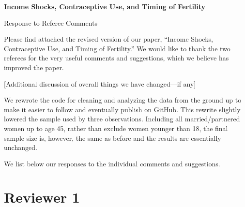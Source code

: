 \documentclass[letterpaper,12pt]{article}
\title{} \author{}
\begin{document}
\begin{center} \textbf{\large Income Shocks, Contraceptive Use, and
Timing of Fertility} \end{center}

\begin{center} Response to Referee Comments \end{center}

\noindent Please find attached the revised version of our paper,
``Income Shocks, Contraceptive Use, and Timing of Fertility.''
We would like to thank the two referees for the very useful comments and
suggestions,
which we believe has improved the paper.

[Additional discussion of overall things we have changed---if any]

We rewrote the code for cleaning and analyzing the data from the ground up 
to make it easier to follow and eventually publish on GitHub.
This rewrite slightly lowered the sample used by three observations.
Including all married/partnered women up to age 45, rather than exclude
women younger than 18, the final sample size is, however, the same as 
before and the results are essentially unchanged.

We list below our responses to the individual comments and suggestions.


\newpage

\section*{Reviewer 1}

\end{document}
